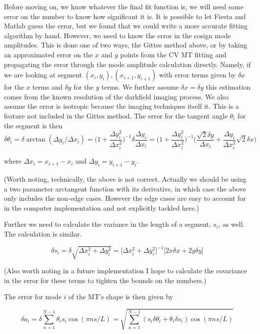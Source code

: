 \documentclass{article}
\theoremstyle{exampstyle} \newtheorem*{remark}{Remark}
\newcommand{\1}{\mathds{1}}
\begin{document}
Before moving on, we know whatever the final fit function is, we will need some error on the number to know how significant it is. It is possible to let Fiesta and Matlab guess the error, but we found that we could write a more accurate fitting algorithm by hand. However, we need to know the error in the cosign mode amplitudes. This is done one of two ways, the Gittes method above, or by taking an approximated error on the $x$ and $y$ points from the CV MT fitting and propagating the error through the mode amplitude calculation directly. Namely, if we are looking at segment $(x_i,y_i),(x_{i+1},y_{i+1})$ with error terms given by $\delta x$ for the $x$ terms and $\delta y$ for the $y$ terms. We further assume $\delta x=\delta y$ this estimation comes from the known resolution of the darkfield imaging process. We also assume the error is isotropic because the imaging techniques itself it. This is a feature not included in the Gittes method. The error for the tangent angle $\theta_i$ for the segment is then 
$$ \delta \theta_i=\delta \arctan(\Delta y_i/\Delta x_i) = \Big (1+\frac{\Delta y_i^2}{\Delta x_i^2}\Big )^{-1} \delta \frac{\Delta y_i}{\Delta x_i} = (1+\frac{\Delta y_i^2}{\Delta x_i^2}\Big )^{-1} \Big ( \frac{\sqrt 2 \delta y}{\Delta x_i} + \frac{\Delta y_i}{\Delta x_i^2}\sqrt 2 \delta x \Big ) $$

where $\Delta x_i=x_{i+1}-x_i$ and $\Delta y_i=y_{i+1}-y_i$.  

(Worth noting, technically, the above is not correct. Actually we should be using a two parameter arctangent function with its derivative, in which case the above only includes the non-edge cases. However the edge cases are easy to account for in the computer implementation and not explicitly tackled here.) 

Further we need to calculate the variance in the length of a segment, $s_i$, as well. The calculation is similar.

$$ \delta s_i = \delta \sqrt{\Delta x_i^2+\Delta y_i^2} = \Big [ \Delta x_i^2 + \Delta y_i^2 \Big ]^{-1} \Big [ 2x\delta x + 2y\delta y \Big ] $$

(Also worth noting in a future implementation I hope to calculate the covariance in the error for these terms to tighten the bounds on the numbers.)

The error for mode $i$ of the MT's shape is then given by 

$$ \delta a_i = \delta \sum_{n=1}^{N-1} \theta_i s_i \cos (\pi ns/L) = \sqrt{\sum_{n=1}^{N-1} (s_i \delta \theta_i + \theta_i \delta s_i)\cos (\pi ns/L)} $$
\end{document}
